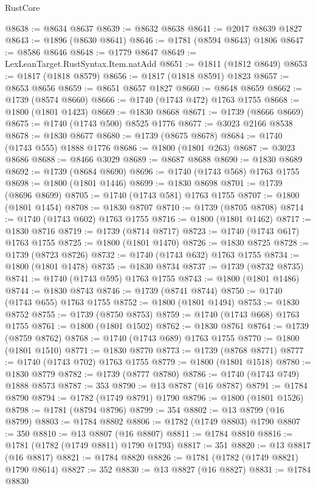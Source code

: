 \begin{lexlean}{RustCore}
\begin{coremodule}
@8638 := @8634 @8637
@8639 := @8632 @8638
@8641 := @2017 @8639 @1827
@8643 := @1896 (@8630 @8641)
@8646 := @1781 (@8594 @8643) @1806
@8647 := @8586 @8646
@8648 := @1779 @8647
@8649 := LexLeanTarget.RustSyntax.Item.natAdd
@8651 := @1811 (@1812 @8649)
@8653 := @1817 (@1818 @8579)
@8656 := @1817 (@1818 @8591) @1823
@8657 := @8653 @8656
@8659 := @8651 @8657 @1827
@8660 := @8648 @8659
@8662 := @1739 (@8574 @8660)
@8666 := @1740 (@1743 @472) @1763 @1755
@8668 := @1800 (@1801 @1423)
@8669 := @1830 @8668
@8671 := @1739 (@8666 @8669)
@8675 := @1740 (@1743 @500) @8525 @1776
@8677 := @3023 @2166 @8538
@8678 := @1830 @8677
@8680 := @1739 (@8675 @8678)
@8684 := @1740 (@1743 @555) @1888 @1776
@8686 := @1800 (@1801 @263)
@8687 := @3023 @8686
@8688 := @8466 @3029
@8689 := @8687 @8688
@8690 := @1830 @8689
@8692 := @1739 (@8684 @8690)
@8696 := @1740 (@1743 @568) @1763 @1755
@8698 := @1800 (@1801 @1446)
@8699 := @1830 @8698
@8701 := @1739 (@8696 @8699)
@8705 := @1740 (@1743 @581) @1763 @1755
@8707 := @1800 (@1801 @1454)
@8708 := @1830 @8707
@8710 := @1739 (@8705 @8708)
@8714 := @1740 (@1743 @602) @1763 @1755
@8716 := @1800 (@1801 @1462)
@8717 := @1830 @8716
@8719 := @1739 (@8714 @8717)
@8723 := @1740 (@1743 @617) @1763 @1755
@8725 := @1800 (@1801 @1470)
@8726 := @1830 @8725
@8728 := @1739 (@8723 @8726)
@8732 := @1740 (@1743 @632) @1763 @1755
@8734 := @1800 (@1801 @1478)
@8735 := @1830 @8734
@8737 := @1739 (@8732 @8735)
@8741 := @1740 (@1743 @595) @1763 @1755
@8743 := @1800 (@1801 @1486)
@8744 := @1830 @8743
@8746 := @1739 (@8741 @8744)
@8750 := @1740 (@1743 @655) @1763 @1755
@8752 := @1800 (@1801 @1494)
@8753 := @1830 @8752
@8755 := @1739 (@8750 @8753)
@8759 := @1740 (@1743 @668) @1763 @1755
@8761 := @1800 (@1801 @1502)
@8762 := @1830 @8761
@8764 := @1739 (@8759 @8762)
@8768 := @1740 (@1743 @689) @1763 @1755
@8770 := @1800 (@1801 @1510)
@8771 := @1830 @8770
@8773 := @1739 (@8768 @8771)
@8777 := @1740 (@1743 @702) @1763 @1755
@8779 := @1800 (@1801 @1518)
@8780 := @1830 @8779
@8782 := @1739 (@8777 @8780)
@8786 := @1740 (@1743 @749) @1888 @8573
@8787 := 353
@8790 := @13 @8787 (@16 @8787)
@8791 := @1784 @8790
@8794 := @1782 (@1749 @8791) @1790
@8796 := @1800 (@1801 @1526)
@8798 := @1781 (@8794 @8796)
@8799 := 354
@8802 := @13 @8799 (@16 @8799)
@8803 := @1784 @8802
@8806 := @1782 (@1749 @8803) @1790
@8807 := 350
@8810 := @13 @8807 (@16 @8807)
@8811 := @1784 @8810
@8816 := @1781 (@1782 (@1749 @8811) @1790 @1793)
@8817 := 351
@8820 := @13 @8817 (@16 @8817)
@8821 := @1784 @8820
@8826 := @1781 (@1782 (@1749 @8821) @1790 @8614)
@8827 := 352
@8830 := @13 @8827 (@16 @8827)
@8831 := @1784 @8830

\end{coremodule}
\end{lexlean}
